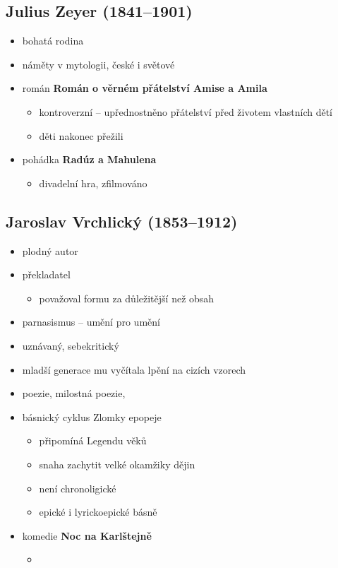 \subsection{Julius Zeyer (1841--1901)}
\begin{itemize}
\item bohatá rodina
\item náměty v mytologii, české i světové
\item román \textbf{Román o věrném přátelství Amise a Amila}
	\begin{itemize}
	\item kontroverzní -- upřednostněno přátelství před životem vlastních dětí
	\item děti nakonec přežili
	\end{itemize}
\item pohádka \textbf{Radúz a Mahulena}
	\begin{itemize}
	\item divadelní hra, zfilmováno
	\end{itemize}
\end{itemize}

\subsection{Jaroslav Vrchlický (1853--1912)} 
\begin{itemize}
\item plodný autor
\item překladatel
	\begin{itemize}
	\item považoval formu za důležitější než obsah
	\end{itemize}
\item parnasismus -- umění pro umění
\item uznávaný, sebekritický
\item mladší generace mu vyčítala lpění na cizích vzorech
\item poezie, milostná poezie, 
\item básnický cyklus Zlomky epopeje
	\begin{itemize}
	\item připomíná Legendu věků
	\item snaha zachytit velké okamžiky dějin
	\item není chronoligické 
	\item epické i lyrickoepické básně
	\end{itemize}
\item komedie \textbf{Noc na Karlštejně}
	\begin{itemize}
	\item 
	\end{itemize}
\end{itemize}



